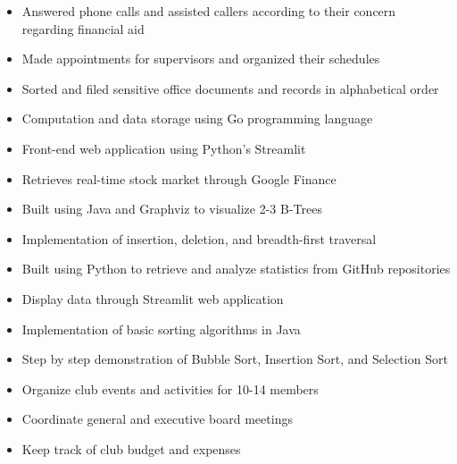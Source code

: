 \begin{itemize}
    \item Answered phone calls and assisted callers according to their concern regarding financial aid
    \item Made appointments for supervisors and organized their schedules
    \item Sorted and filed sensitive office documents and records in alphabetical order
\end{itemize}
\begin{itemize}
    \item Computation and data storage using Go programming language
    \item Front-end web application using Python’s Streamlit
    \item Retrieves real-time stock market through Google Finance
\end{itemize}
\smallskip
{}
\begin{itemize}
    \item Built using Java and Graphviz to visualize 2-3 B-Trees
    \item Implementation of insertion, deletion, and breadth-first traversal
\end{itemize}
\smallskip
{}
\begin{itemize}
    \item Built using Python to retrieve and analyze statistics from GitHub repositories
    \item Display data through Streamlit web application
\end{itemize}
\smallskip
{}
\begin{itemize}
    \item Implementation of basic sorting algorithms in Java
    \item Step by step demonstration of Bubble Sort, Insertion Sort, and Selection Sort
\end{itemize}

\begin{itemize}
    \item Organize club events and activities for 10-14 members
    \item Coordinate general and executive board meetings
    \item Keep track of club budget and expenses
\end{itemize}



